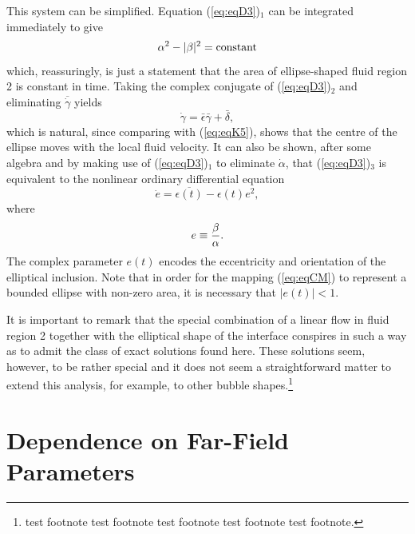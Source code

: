 \documentclass{article}
\begin{document}
This system can be simplified. Equation (\ref{eq:eqD3})$_{1}$ can be integrated immediately to give
\begin{equation}
\alpha^2 - |\beta|^2 = {\rm constant}
\label{eq:eqF1}
\end{equation}
which, reassuringly, is just a statement that the area  of ellipse-shaped
fluid region 2 is constant in time. Taking the complex conjugate of (\ref{eq:eqD3})$_{2}$ and eliminating $\overline{\dot \gamma}$ yields
\begin{equation}
\dot \gamma = \bar \epsilon \bar \gamma + \bar \delta,
\label{eq:eqF2}
\end{equation}
which is natural, since comparing with (\ref{eq:eqK5}),  shows   that the
centre of the ellipse moves with the local fluid velocity. It can also be
shown, after some algebra and by making use of (\ref{eq:eqD3})$_{1}$
to eliminate $\dot \alpha$, that (\ref{eq:eqD3})$_{3}$
is equivalent to the nonlinear ordinary differential equation
\begin{equation}
\dot e = \overline{\epsilon(t)} - \epsilon(t) e^2,\label{eq:eqRic}
\end{equation}
where 
\begin{equation}
e \equiv {\beta \over \alpha}.
\end{equation}
The complex parameter $e(t)$ encodes the eccentricity and orientation of
the elliptical inclusion. Note that in order for the mapping (\ref{eq:eqCM})
to represent a bounded ellipse with non-zero area, it is necessary that $|e(t)| < 1$.

It is important to remark that the special
combination of a linear flow in fluid region 2 together with the
elliptical shape of the interface conspires in such a way as
to admit the class of exact solutions found here. These solutions
seem, however, to be rather special and it does not seem
a straightforward matter to extend this analysis, for example, to other
bubble shapes.\footnote{test footnote test footnote test footnote test footnote
test footnote.}

\section{Dependence on Far-Field Parameters}
\end{document}
